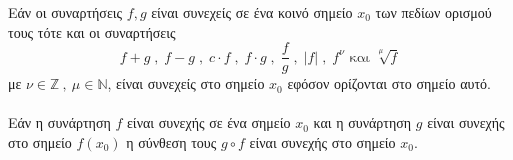 \documentclass[twoside,nofonts,ektypwsh,math,spyros]{frontisthrio}
\begin{document}
Εάν οι συναρτήσεις $ f,g $ είναι συνεχείς σε ένα κοινό σημείο $ x_0 $ των πεδίων ορισμού τους τότε και οι συναρτήσεις \[ f+g\;,\;f-g\;,\;c\cdot f\;,\;f\cdot g\;,\;\frac{f}{g}\;,\;|f|\;,\;f^\nu\textrm{ και }\sqrt[\mu]{f} \]
με $ \nu\in\mathbb{Z}\ ,\ \mu\in\mathbb{N} $, είναι συνεχείς στο σημείο $ x_0 $ εφόσον ορίζονται στο σημείο αυτό.\\\\
Εάν η συνάρτηση $ f $ είναι συνεχής σε ένα σημείο $ x_0 $ και η συνάρτηση $ g $ είναι συνεχής στο σημείο $ f(x_0) $ η σύνθεση τους $ g\circ f $ είναι συνεχής στο σημείο $ x_0 $.\\\\
\end{document}
